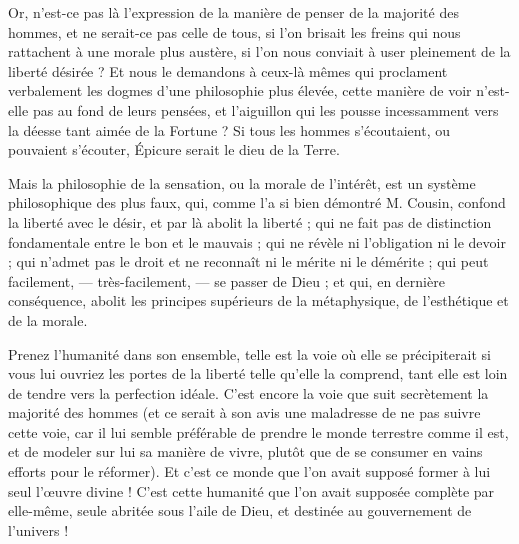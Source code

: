\documentclass[a4paper, 11pt, oneside]{article}
\begin{document}
Or, n'est-ce pas là l'expression de la manière de penser de la majorité des hommes, et ne serait-ce pas celle de tous, si l'on brisait les freins qui nous rattachent à une morale plus austère, si l'on nous conviait à user pleinement de la liberté désirée ? Et nous le demandons à ceux-là mêmes qui proclament verbalement les dogmes d'une philosophie plus élevée, cette manière de voir n'est-elle pas au fond de leurs pensées, et l'aiguillon qui les pousse incessamment vers la déesse tant aimée de la Fortune ? Si tous les hommes s'écoutaient, ou pouvaient s'écouter, Épicure serait le dieu de la Terre.

Mais la philosophie de la sensation, ou la morale de l'intérêt, est un système philosophique des plus faux, qui, comme l'a si bien démontré M. Cousin, confond la liberté avec le désir, et par là abolit la liberté ; qui ne fait pas de distinction fondamentale entre le bon et le mauvais ; qui ne révèle ni l'obligation ni le devoir ; qui n'admet pas le droit et ne reconnaît ni le mérite ni le démérite ; qui peut facilement, --- très-facilement, --- se passer de Dieu ; et qui, en dernière conséquence, abolit les principes supérieurs de la métaphysique, de l'esthétique et de la morale.

Prenez l'humanité dans son ensemble, telle est la voie où elle se précipiterait si vous lui ouvriez les portes de la liberté telle qu'elle la comprend, tant elle est loin de tendre vers la perfection idéale. C'est encore la voie que suit secrètement la majorité des hommes (et ce serait à son avis une maladresse de ne pas suivre cette voie, car il lui semble préférable de prendre le monde terrestre comme il est, et de modeler sur lui sa manière de vivre, plutôt que de se consumer en vains efforts pour le réformer). Et c'est ce monde que l'on avait supposé former à lui seul l'œuvre divine ! C'est cette humanité que l'on avait supposée complète par elle-même, seule abritée sous l'aile de Dieu, et destinée au gouvernement de l'univers !
\end{document}
